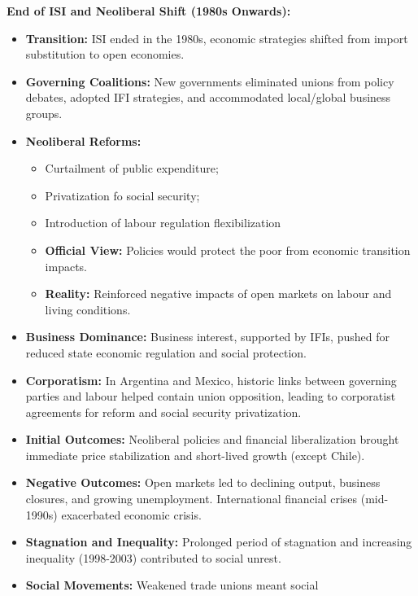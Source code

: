 \documentclass{article}
\begin{document}
    \noindent \textbf{End of ISI and Neoliberal Shift (1980s Onwards):}
    \begin{itemize}
        \item \textbf{Transition:} ISI ended in the 1980s, economic strategies
        shifted from import substitution to open economies.
        \item \textbf{Governing Coalitions:} New governments eliminated
        unions from policy debates, adopted IFI strategies, and accommodated
        local/global business groups.
        \item \textbf{Neoliberal Reforms:}
        \begin{itemize}
            \item Curtailment of public expenditure;
            \item Privatization fo social security;
            \item Introduction of labour regulation flexibilization
            \item \textbf{Official View:} Policies would protect the poor
            from economic transition impacts.
            \item \textbf{Reality:} Reinforced negative impacts of open
            markets on labour and living conditions.
        \end{itemize}
        \item \textbf{Business Dominance:} Business interest, supported by
        IFIs, pushed for reduced state economic regulation and social
        protection.
        \item \textbf{Corporatism:} In Argentina and Mexico, historic links
        between governing parties and labour helped contain union
        opposition, leading to corporatist agreements for reform and social
        security privatization.
        \item \textbf{Initial Outcomes:} Neoliberal policies and financial
        liberalization brought immediate price stabilization and short-lived
        growth (except Chile).
        \item \textbf{Negative Outcomes:} Open markets led to declining
        output, business closures, and growing unemployment. International
        financial crises (mid-1990s) exacerbated economic crisis.
        \item \textbf{Stagnation and Inequality:} Prolonged period of
        stagnation and increasing inequality (1998-2003) contributed to
        social unrest.
        \item \textbf{Social Movements:} Weakened trade unions meant social

\end{itemize}
\end{document}
